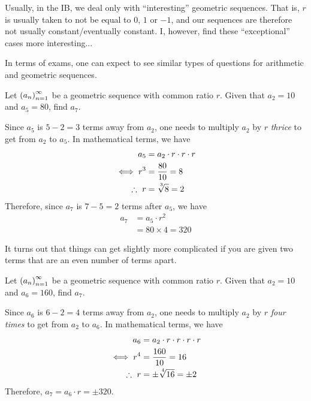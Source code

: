 \begin{remark}
    Usually, in the IB, we deal only with ``interesting'' geometric sequences. That is, $r$ is usually taken to not be equal to $0$, $1$ or $-1$, and our sequences are therefore not usually constant/eventually constant. I, however, find these ``exceptional'' cases more interesting...
\end{remark}

In terms of exams, one can expect to see similar types of questions for arithmetic and geometric sequences.
\begin{boxexample}
    Let $\left( a_n \right)_{n=1}^{\infty}$ be a geometric sequence with common ratio $r$. Given that $a_2 = 10$ and $a_5 = 80$, find $a_7$.
    \begin{solution}
        Since $a_5$ is $5 - 2 = 3$ terms away from $a_2$, one needs to multiply $a_2$ by $r$ \textit{thrice} to get from $a_2$ to $a_5$. In mathematical terms, we have
        \begin{align*}
            a_5 &= a_2 \cdot r \cdot r \cdot r \\
            \iff r^3 &= \frac{80}{10} = 8 \\
            \ergo \ r &= \cbrt{8} = 2
        \end{align*}
        Therefore, since $a_7$ is $7 - 5 = 2$ terms after $a_5$, we have
        \begin{align*}
            a_7 &= a_5 \cdot r^2 \\
            &= 80 \times 4 = 320
        \end{align*}
        \vspace{-2em}
    \end{solution}
\end{boxexample}

It turns out that things can get slightly more complicated if you are given two terms that are an even number of terms apart.

\begin{boxexample}
    Let $\left( a_n \right)_{n=1}^{\infty}$ be a geometric sequence with common ratio $r$. Given that $a_2 = 10$ and $a_6 = 160$, find $a_7$.
    \begin{solution}
        Since $a_6$ is $6 - 2 = 4$ terms away from $a_2$, one needs to multiply $a_2$ by $r$ \textit{four times} to get from $a_2$ to $a_6$. In mathematical terms, we have
        \begin{align*}
            a_6 &= a_2 \cdot r \cdot r \cdot r \cdot r \\
            \iff r^4 &= \frac{160}{10} = 16 \\
            \ergo \ r &= \pm \nthroot{4}{16} = \pm 2
        \end{align*}
        Therefore, $a_7 = a_6 \cdot r = \pm 320$.
    \end{solution}
\end{boxexample}

